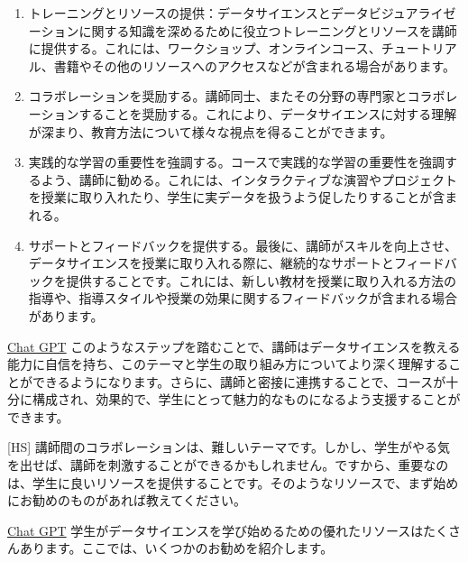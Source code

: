 \documentclass[
]{book}
\theoremstyle{definition}
\theoremstyle{definition}
\theoremstyle{definition}
\theoremstyle{definition}
\theoremstyle{remark}
\begin{document}
\begin{enumerate}
\def\labelenumi{\arabic{enumi}.}
\item
  トレーニングとリソースの提供：データサイエンスとデータビジュアライゼーションに関する知識を深めるために役立つトレーニングとリソースを講師に提供する。これには、ワークショップ、オンラインコース、チュートリアル、書籍やその他のリソースへのアクセスなどが含まれる場合があります。
\item
  コラボレーションを奨励する。講師同士、またその分野の専門家とコラボレーションすることを奨励する。これにより、データサイエンスに対する理解が深まり、教育方法について様々な視点を得ることができます。
\item
  実践的な学習の重要性を強調する。コースで実践的な学習の重要性を強調するよう、講師に勧める。これには、インタラクティブな演習やプロジェクトを授業に取り入れたり、学生に実データを扱うよう促したりすることが含まれる。
\item
  サポートとフィードバックを提供する。最後に、講師がスキルを向上させ、データサイエンスを授業に取り入れる際に、継続的なサポートとフィードバックを提供することです。これには、新しい教材を授業に取り入れる方法の指導や、指導スタイルや授業の効果に関するフィードバックが含まれる場合があります。
\end{enumerate}

\protect\hyperlink{chatgpt}{Chat GPT} このようなステップを踏むことで、講師はデータサイエンスを教える能力に自信を持ち、このテーマと学生の取り組み方についてより深く理解することができるようになります。さらに、講師と密接に連携することで、コースが十分に構成され、効果的で、学生にとって魅力的なものになるよう支援することができます。

{[}HS{]} 講師間のコラボレーションは、難しいテーマです。しかし、学生がやる気を出せば、講師を刺激することができるかもしれません。ですから、重要なのは、学生に良いリソースを提供することです。そのようなリソースで、まず始めにお勧めのものがあれば教えてください。

\protect\hyperlink{chatgpt}{Chat GPT} 学生がデータサイエンスを学び始めるための優れたリソースはたくさんあります。ここでは、いくつかのお勧めを紹介します。
\end{document}
